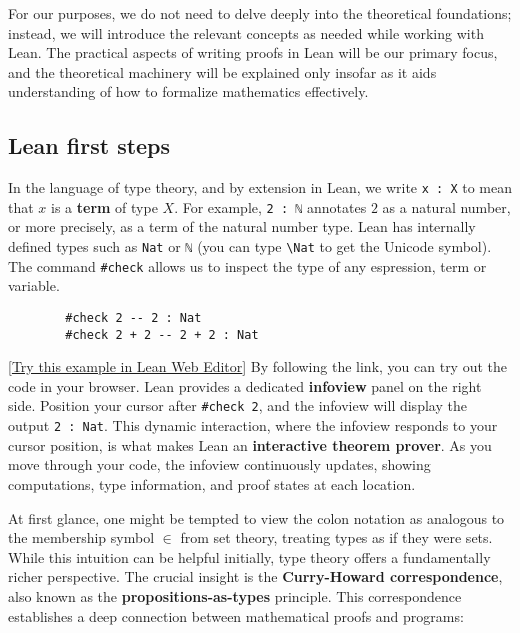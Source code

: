 For our purposes, we do not need to delve deeply into the theoretical foundations;
instead, we will introduce the relevant concepts as needed while working with Lean.
The practical aspects of writing proofs in Lean will be our primary focus,
and the theoretical machinery will be explained only insofar as it aids understanding
of how to formalize mathematics effectively.
\subsection{Lean first steps}

In the language of type theory, and by extension in Lean, we write \lstinline[language=lean]|x : X|
to mean that $x$ is a \textbf{term} of type $X$.
For example, \lstinline[language=lean]|2 : ℕ| annotates $2$ as a natural number,
or more precisely, as a term of the natural number type.
Lean has internally defined types such as \lstinline[language=lean]|Nat| or \lstinline[language=lean]|ℕ|
(you can type \texttt{\textbackslash Nat} to get the Unicode symbol).
The command \lstinline[language=lean]|#check| allows us to inspect the type of any espression, term or variable.
\begin{example}\mbox{}

  \begin{lstlisting}
        #check 2 -- 2 : Nat
        #check 2 + 2 -- 2 + 2 : Nat
    \end{lstlisting}
  [\href{https://live.lean-lang.org/#codez=MQYwFgpiDWAEBMAoUkYNgagUA}{Try this example in Lean Web Editor}]
  By following the link, you can try out the code in your browser.
  Lean provides a dedicated \textbf{infoview} panel on the right side.
  Position your cursor after \lstinline[language=lean]|#check 2|,
  and the infoview will display the output \lstinline[language=lean]|2 : Nat|.
  This dynamic interaction, where the infoview responds to your cursor position, is
  what makes Lean an \textbf{interactive theorem prover}.
  As you move through your code, the infoview continuously updates,
  showing computations, type information, and proof states at each location.
\end{example}
At first glance, one might be tempted to view the colon notation as analogous to the membership
symbol $\in$ from set theory, treating types as if they were sets.
While this intuition can be helpful initially, type theory offers a fundamentally richer perspective.
The crucial insight is the \textbf{Curry-Howard correspondence},
also known as the \textbf{propositions-as-types} principle.
This correspondence establishes a deep connection between mathematical proofs and programs:
